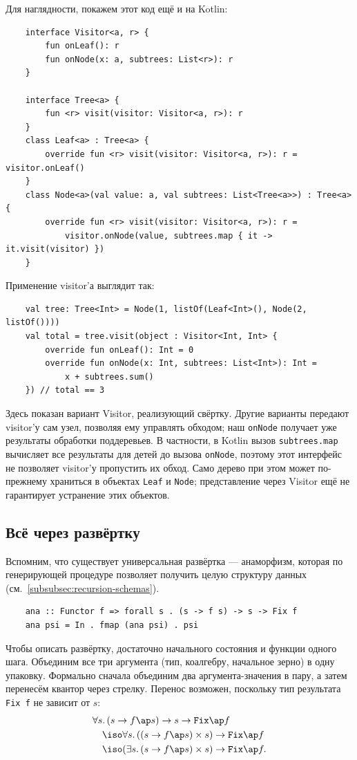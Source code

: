 Для наглядности, покажем этот код ещё и на Kotlin:
\begin{verbatim}
    interface Visitor<a, r> {
        fun onLeaf(): r
        fun onNode(x: a, subtrees: List<r>): r
    }

    interface Tree<a> {
        fun <r> visit(visitor: Visitor<a, r>): r
    }
    class Leaf<a> : Tree<a> {
        override fun <r> visit(visitor: Visitor<a, r>): r = visitor.onLeaf()
    }
    class Node<a>(val value: a, val subtrees: List<Tree<a>>) : Tree<a> {
        override fun <r> visit(visitor: Visitor<a, r>): r =
            visitor.onNode(value, subtrees.map { it -> it.visit(visitor) })
    }
\end{verbatim}
Применение visitor'а выглядит так:
\begin{verbatim}
    val tree: Tree<Int> = Node(1, listOf(Leaf<Int>(), Node(2, listOf())))
    val total = tree.visit(object : Visitor<Int, Int> {
        override fun onLeaf(): Int = 0
        override fun onNode(x: Int, subtrees: List<Int>): Int =
            x + subtrees.sum()
    }) // total == 3
\end{verbatim}
Здесь показан вариант Visitor, реализующий свёртку.
Другие варианты передают visitor'у сам узел, позволяя ему управлять обходом; наш \texttt{onNode} получает уже результаты обработки поддеревьев.
В частности, в Kotlin вызов \texttt{subtrees.map} вычисляет все результаты для детей до вызова \texttt{onNode}, поэтому этот интерфейс не позволяет visitor'у пропустить их обход.
Само дерево при этом может по-прежнему храниться в объектах \texttt{Leaf} и \texttt{Node}; представление через Visitor ещё не гарантирует устранение этих объектов.


\subsection{Всё через развёртку} \label{subsec:all-unfolds}

Вспомним, что существует универсальная развёртка --- анаморфизм, которая по генерирующей процедуре позволяет получить целую структуру данных (см.~\ref{subsubsec:recursion-schemas}).
\begin{verbatim}
    ana :: Functor f => forall s . (s -> f s) -> s -> Fix f
    ana psi = In . fmap (ana psi) . psi
\end{verbatim}

Чтобы описать развёртку, достаточно начального состояния и функции одного шага.
Объединим все три аргумента (тип, коалгебру, начальное зерно) в одну упаковку.
Формально сначала объединим два аргумента-значения в пару, а затем перенесём квантор через стрелку.
Перенос возможен, поскольку тип результата \texttt{Fix f} не зависит от $s$:
\[
    \begin{aligned}
        &\forall s\ldotp (s\to f\ap s)\to s\to \texttt{Fix}\ap f \\
        &\quad\iso \forall s\ldotp ((s\to f\ap s)\times s)\to \texttt{Fix}\ap f \\
        &\quad\iso (\exists s\ldotp (s\to f\ap s)\times s)\to \texttt{Fix}\ap f.
    \end{aligned}
\]

